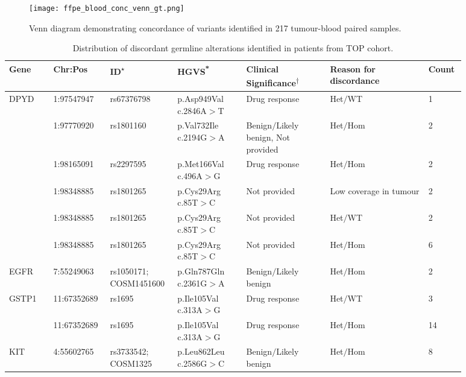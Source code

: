 \begin{figure}[H]
\centering
	\texttt{[image: ffpe\_blood\_conc\_venn\_gt.png]}
	\caption{Venn diagram demonstrating concordance of variants identified in 217 tumour-blood paired samples.}
	\label{fig:ffpe_blood_conc_venn}
\end{figure}


\newpage
\begin{landscape}

\begin{longtable}{p{0.09\linewidth}|p{0.1\linewidth}p{0.12\linewidth}p{0.14\linewidth}p{0.17\linewidth}p{0.2\linewidth}p{0.06\linewidth}}
\caption{Distribution of discordant germline alterations identified in patients from TOP cohort.}
\label{tbl:freq_discordant_germline}
		\\
		\hline
		Gene & Chr:Pos & ID\textsuperscript{$\star$} & HGVS\textsuperscript{*} & Clinical Significance\textsuperscript{$\dagger$} & Reason for discordance & Count
		\\
		\hline
		DPYD & 1:97547947 & rs67376798 & p.Asp949Val c.2846A$>$T & Drug response & Het$/$WT & 1
		\\
		& 1:97770920 & rs1801160 & p.Val732Ile c.2194G$>$A & Benign$/$Likely benign, Not provided & Het$/$Hom & 2
		\\
		& 1:98165091 & rs2297595 & p.Met166Val c.496A$>$G & Drug response &  Het$/$Hom & 2
		\\
		& 1:98348885 & rs1801265 & p.Cys29Arg c.85T$>$C & Not provided & Low coverage in tumour & 2
		\\
		& 1:98348885 & rs1801265 & p.Cys29Arg c.85T$>$C & Not provided & Het$/$WT & 2
		\\
		& 1:98348885 & rs1801265 & p.Cys29Arg c.85T$>$C & Not provided & Het$/$Hom & 6
		\\
		\hline
		EGFR & 7:55249063 & rs1050171; COSM1451600 & p.Gln787Gln c.2361G$>$A & Benign$/$Likely benign & Het$/$Hom & 2
		\\
		\hline
		GSTP1 & 11:67352689 & rs1695 & p.Ile105Val c.313A$>$G & Drug response & Het$/$WT & 3
		\\
		& 11:67352689 & rs1695 & p.Ile105Val c.313A$>$G & Drug response & Het$/$Hom & 14
		\\
		\hline
		KIT & 4:55602765 & rs3733542; COSM1325 & p.Leu862Leu c.2586G$>$C & Benign$/$Likely benign & Het$/$Hom & 8
		\\

\end{longtable}
\end{landscape}

